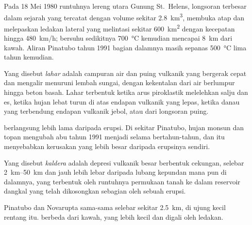 Pada 18 Mei 1980 runtuhnya lereng utara Gunung St.~Helens, longsoran
terbesar dalam sejarah yang tercatat dengan volume sekitar \qty{2.8}{km^3}, membuka atap  dan
melepaskan ledakan lateral yang melintasi sekitar \qty{600}{km^2} dengan kecepatan hingga
\qty{480}{km/h};  bersuhu sedikitnya \qty{700}{\celsius} kemudian mencapai
\qty{8}{km} dari kawah. Aliran Pinatubo tahun 1991 bagian dalamnya masih sepanas
\qty{500}{\celsius} lima tahun kemudian.

\begin{definition}[Lahar]\label{def:b2:eruptive-styles:lahar}
Yang disebut \emph{lahar} adalah campuran air dan puing vulkanik yang bergerak cepat
dan mengalir menuruni lembah sungai, dengan kekentalan dari air berlumpur
hingga beton basah. Lahar terbentuk ketika arus piroklastik melelehkan salju dan es, ketika
hujan lebat turun di atas endapan vulkanik yang lepas, ketika danau yang terbendung endapan
vulkanik jebol, atau dari longsoran puing.
\end{definition}

 berlangsung lebih lama daripada erupsi. Di sekitar Pinatubo, hujan monsun dan topan mengubah
abu tahun 1991 menjadi  selama bertahun-tahun, dan  itu menyebabkan kerusakan yang lebih besar daripada
erupsinya sendiri.

\begin{definition}[Kaldera]\label{def:b2:eruptive-styles:caldera}
Yang disebut \emph{kaldera} adalah depresi vulkanik besar berbentuk cekungan,
selebar \qtyrange{2}{50}{km} dan jauh lebih lebar daripada lubang kepundan mana pun di dalamnya, yang terbentuk oleh
runtuhnya permukaan tanah ke dalam reservoir  dangkal yang telah dikosongkan sebagian
oleh sebuah erupsi.
\end{definition}

 Pinatubo dan Novarupta sama-sama selebar sekitar \qty{2.5}{km}, di
ujung kecil rentang itu.  berbeda dari kawah, yang lebih kecil dan digali oleh ledakan.

